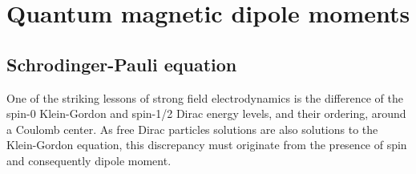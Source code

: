 \chapter{Quantum magnetic dipole moments}
\section{Schrodinger-Pauli equation}\label{ajss:quantumdipole}
\noindent One of the striking lessons of strong field electrodynamics is the difference of the spin-0 Klein-Gordon and spin-1/2 Dirac energy levels, and their ordering, around a Coulomb center. As free Dirac particles solutions are also solutions to the Klein-Gordon equation, this discrepancy must originate from the presence of spin and consequently dipole moment.

